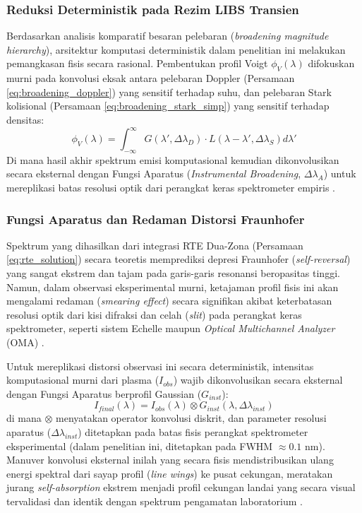 \documentclass[10pt,leqno]{amsart}
\begin{document}
\subsubsection{Reduksi Deterministik pada Rezim LIBS Transien}
Berdasarkan analisis komparatif besaran pelebaran (\textit{broadening magnitude hierarchy}), arsitektur komputasi deterministik dalam penelitian ini melakukan pemangkasan fisis secara rasional. Pembentukan profil Voigt $\phi_V(\lambda)$ difokuskan murni pada konvolusi eksak antara pelebaran Doppler (Persamaan \ref{eq:broadening_doppler}) yang sensitif terhadap suhu, dan pelebaran Stark kolisional (Persamaan \ref{eq:broadening_stark_simp}) yang sensitif terhadap densitas:
\begin{equation} \label{eq:voigt_final}
\phi_V(\lambda) = \int_{-\infty}^{\infty} G(\lambda', \Delta\lambda_D) \cdot L(\lambda - \lambda', \Delta\lambda_S) d\lambda'
\end{equation}
Di mana hasil akhir spektrum emisi komputasional kemudian dikonvolusikan secara eksternal dengan Fungsi Aparatus (\textit{Instrumental Broadening}, $\Delta\lambda_A$) untuk mereplikasi batas resolusi optik dari perangkat keras spektrometer empiris \cite{favre_merlin_2025}.

\subsubsection{Fungsi Aparatus dan Redaman Distorsi Fraunhofer}
Spektrum yang dihasilkan dari integrasi RTE Dua-Zona (Persamaan \ref{eq:rte_solution}) secara teoretis memprediksi depresi Fraunhofer (\textit{self-reversal}) yang sangat ekstrem dan tajam pada garis-garis resonansi beropasitas tinggi. Namun, dalam observasi eksperimental murni, ketajaman profil fisis ini akan mengalami redaman (\textit{smearing effect}) secara signifikan akibat keterbatasan resolusi optik dari kisi difraksi dan celah (\textit{slit}) pada perangkat keras spektrometer, seperti sistem Echelle maupun \textit{Optical Multichannel Analyzer} (OMA) \cite{zaitsev_two-zone_2024}.

Untuk mereplikasi distorsi observasi ini secara deterministik, intensitas komputasional murni dari plasma ($I_{obs}$) wajib dikonvolusikan secara eksternal dengan Fungsi Aparatus berprofil Gaussian ($G_{inst}$):
\begin{equation} \label{eq:instrumental}
I_{final}(\lambda) = I_{obs}(\lambda) \otimes G_{inst}(\lambda, \Delta\lambda_{inst})
\end{equation}
di mana $\otimes$ menyatakan operator konvolusi diskrit, dan parameter resolusi aparatus ($\Delta\lambda_{inst}$) ditetapkan pada batas fisis perangkat spektrometer eksperimental (dalam penelitian ini, ditetapkan pada FWHM $\approx 0.1$ nm). Manuver konvolusi eksternal inilah yang secara fisis mendistribusikan ulang energi spektral dari sayap profil (\textit{line wings}) ke pusat cekungan, meratakan jurang \textit{self-absorption} ekstrem menjadi profil cekungan landai yang secara visual tervalidasi dan identik dengan spektrum pengamatan laboratorium \cite{favre_merlin_2025}.
\end{document}
